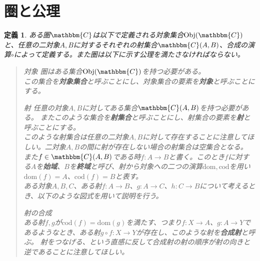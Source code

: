 \documentclass[uplatex,dvipdfmx]{jsarticle}
\newcommand{\cat}[1]{\mathbbm{#1}}
\newcommand{\arrow}{\rightarrow}
\newcommand{\obj}[1]{\mathrm{Obj}(\cat{#1})}
\newcommand{\mor}[3]{#1:#2\arrow #3}
\newcommand{\dom}{\mathrm{dom}}
\newcommand{\cod}{\mathrm{cod}}
\newcommand{\arset}[3]{\cat{#1}(#2,#3)}
\newtheorem{define}[proof]{定義}
\numberwithin{proof}{subsection}
\newenvironment{mydescription}
{\begin{description}
  \setlength{\parskip}{0.5cm}
}
{\end{description}}
\begin{document}
  \section{圏と公理}
	\begin{define}
    ある圏$\cat{C}$は以下で定義される対象集合$\obj{C}$と、任意の二対象$A,B$に対するそれぞれの射集合$\arset{C}{A}{B}$、合成の演算$\circ$によって定義する。また圏は以下に示す公理を満たさなければならない。
		\begin{quote}
			\begin{mydescription}
			\item[対象] 圏はある集合$\obj{C}$を持つ必要がある。\\
			この集合を\textbf{対象集合}と呼ぶことにし、対象集合の要素を\textbf{対象}と呼ぶことにする。
			\item[射] 任意の対象$A,B$に対してある集合$\arset{C}{A}{B}$を持つ必要がある。
      またこのような集合を\textbf{射集合}と呼ぶことにし、射集合の要素を\textbf{射}と呼ぶことにする。\\
			このような射集合は任意の二対象$A,B$に対して存在することに注意してほしい。二対象$A,B$の間に射が存在しない場合の射集合は空集合となる。
			\\また$f\in\arset{C}{A}{B}$である時$\mor{f}{A}{B}$と書く。このとき$f$に対する$A$を\textbf{始域}、$B$を\textbf{終域}と呼び、射から対象への二つの演算$\dom,\cod$を用い$\dom(f)=A$、$\cod(f)=B$と表す。\\

			ある対象$A,B,C$、ある射$\mor{f}{A}{B}$、$\mor{g}{A}{C}$、$\mor{h}{C}{B}$について考えるとき、以下のような図式を用いて説明を行う。
			\begin{center}
			\end{center}
			\item[射の合成]~\\ ある射$f,g$が$\cod(f)=\dom(g)$を満たす、つまり$\mor{f}{X}{A}$、$\mor{g}{A}{Y}$であるようなとき、ある射$\mor{g\circ f}{X}{Y}$が存在し、このような射を\textbf{合成射}と呼ぶ。
			射をつなげる、という直感に反して合成射の射の順序が射の向きと逆であることに注意してほしい。


\end{mydescription}
\end{quote}
\end{define}
\end{document}
